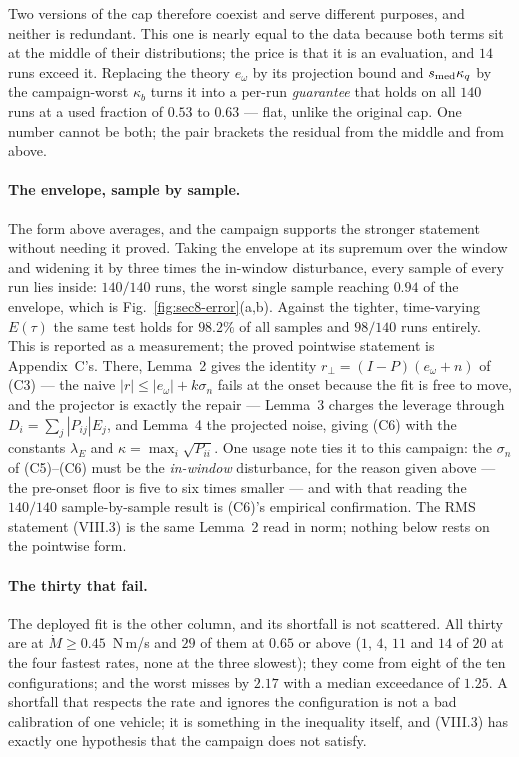 \documentclass[10pt]{article}
\newcommand{\Mdot}{\dot M}
\begin{document}
Two versions of the cap therefore coexist and serve different
purposes, and neither is redundant. This one is nearly equal to the
data because both terms sit at the middle of their distributions; the
price is that it is an evaluation, and $14$ runs exceed it. Replacing
the theory $e_\omega$ by its projection bound and $s_{\rm med}\kappa_q$
by the campaign-worst $\kappa_b$ turns it into a per-run
\emph{guarantee} that holds on all $140$ runs at a used fraction of
$0.53$ to $0.63$ --- flat, unlike the original cap. One number cannot
be both; the pair brackets the residual from the middle and from
above.

\paragraph{The envelope, sample by sample.} The form above averages, and
the campaign supports the stronger statement without needing it proved.
Taking the envelope at its supremum over the window and widening it by
three times the in-window disturbance, every sample of every run lies
inside: $140/140$ runs, the worst single sample reaching $0.94$ of the
envelope, which is Fig.~\ref{fig:sec8-error}(a,b). Against the tighter,
time-varying $E(\tau)$ the same test holds for $98.2\%$ of all samples
and $98/140$ runs entirely. This is reported as a measurement; the
proved pointwise statement is Appendix~C's. There, Lemma~2 gives the
identity $r_\perp = (I-P)(e_\omega + n)$ of (C3) --- the naive
$|r|\le|e_\omega|+k\sigma_n$ fails at the onset because the fit is free
to move, and the projector is exactly the repair --- Lemma~3 charges
the leverage through $D_i = \sum_j|P_{ij}|E_j$, and Lemma~4 the
projected noise, giving (C6) with the constants $\lambda_E$ and
$\kappa = \max_i\sqrt{P_{ii}}$. One usage note ties it to this
campaign: the $\sigma_n$ of (C5)--(C6) must be the \emph{in-window}
disturbance, for the reason given above --- the pre-onset floor is
five to six times smaller --- and with that reading the $140/140$
sample-by-sample result is (C6)'s empirical confirmation. The RMS
statement (VIII.3) is the same Lemma~2 read in norm; nothing below
rests on the pointwise form.

\paragraph{The thirty that fail.} The deployed fit is the other column,
and its shortfall is not scattered. All thirty are at
$\Mdot\ge0.45$~N\,m/s and $29$ of them at $0.65$ or above ($1$, $4$,
$11$ and $14$ of $20$ at the four fastest rates, none at the three
slowest); they come from eight of the ten configurations; and the worst
misses by $2.17$ with a median exceedance of $1.25$. A shortfall that
respects the rate and ignores the configuration is not a bad calibration
of one vehicle; it is something in the inequality itself, and (VIII.3)
has exactly one hypothesis that the campaign does not satisfy.
\end{document}
